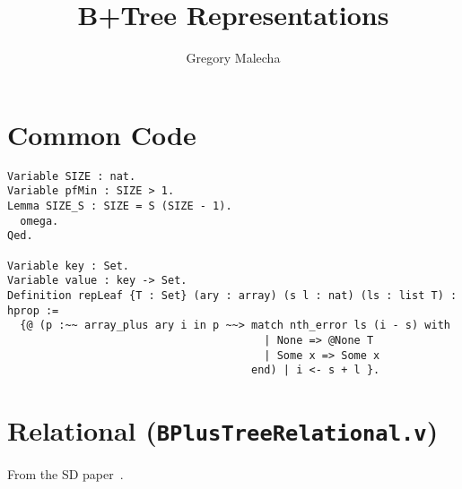 \documentclass{article}
\title{B+Tree Representations}
\author{Gregory Malecha}
\begin{document}
\maketitle
\section{Common Code}

\begin{lstlisting}
Variable SIZE : nat.
Variable pfMin : SIZE > 1.
Lemma SIZE_S : SIZE = S (SIZE - 1).
  omega.
Qed.

Variable key : Set.
Variable value : key -> Set.
Definition repLeaf {T : Set} (ary : array) (s l : nat) (ls : list T) : hprop :=
  {@ (p :~~ array_plus ary i in p ~~> match nth_error ls (i - s) with
                                        | None => @None T
                                        | Some x => Some x
                                      end) | i <- s + l }.
\end{lstlisting}

\newpage
\section{Relational ({\tt BPlusTreeRelational.v})}
From the SD paper~\cite{sexton2008rabtossl}.
\end{document}
